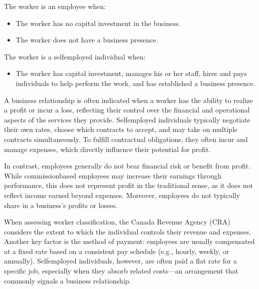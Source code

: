 \documentclass[letterpaper,10pt,english]{sphinxmanual}
\begin{document}
\sphinxAtStartPar
The worker is an employee when:
\begin{itemize}
\item {} 
\sphinxAtStartPar
The worker has no capital investment in the business.

\item {} 
\sphinxAtStartPar
The worker does not have a business presence.

\end{itemize}

\sphinxAtStartPar
The worker is a self\sphinxhyphen{}employed individual when:
\begin{itemize}
\item {} 
\sphinxAtStartPar
The worker has capital investment, manages his or her staff, hires and pays individuals to help perform the work, and has established a business presence.

\end{itemize}

\sphinxAtStartPar
{}

\sphinxAtStartPar
A business relationship is often indicated when a worker has the ability to realize a profit or incur a loss, reflecting their
control over the financial and operational aspects of the services they provide. Self\sphinxhyphen{}employed individuals typically
negotiate their own rates, choose which contracts to accept, and may take on multiple contracts simultaneously. To fulfill
contractual obligations, they often incur and manage expenses, which directly influence their potential for profit.

\sphinxAtStartPar
In contrast, employees generally do not bear financial risk or benefit from profit. While commission\sphinxhyphen{}based employees may
increase their earnings through performance, this does not represent profit in the traditional sense, as it does not reflect
income earned beyond expenses. Moreover, employees do not typically share in a business’s profits or losses.

\sphinxAtStartPar
When assessing worker classification, the Canada Revenue Agency (CRA) considers the extent to which the individual controls
their revenue and expenses. Another key factor is the method of payment: employees are usually compensated at a fixed rate
based on a consistent pay schedule (e.g., hourly, weekly, or annually). Self\sphinxhyphen{}employed individuals, however, are often paid a
flat rate for a specific job, especially when they absorb related costs—an arrangement that commonly signals a business
relationship.
\end{document}
